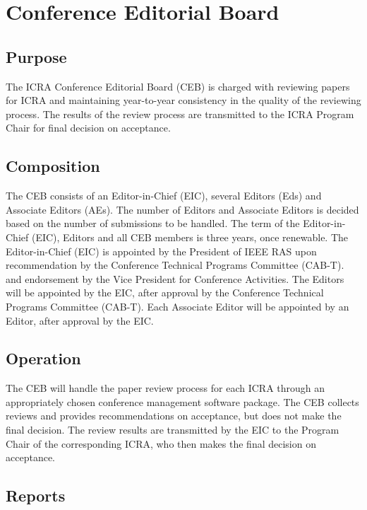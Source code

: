 \documentclass[10pt]{article}
\begin{document}
\section{Conference Editorial Board}
\label{CEB}

\subsection{Purpose}

The ICRA Conference Editorial Board (CEB) is charged with reviewing papers for ICRA and maintaining year-to-year consistency in the quality of the reviewing process. The results of the review process are transmitted to the ICRA Program Chair for final decision on acceptance. 


\subsection{Composition}

The CEB consists of an Editor-in-Chief (EIC), several Editors (Eds) and Associate Editors (AEs). The number of Editors and Associate Editors is decided based on the number of submissions to be handled. The term of the Editor-in-Chief (EIC), Editors and all CEB members is three years, once renewable. The Editor-in-Chief (EIC) is appointed by the President of IEEE RAS upon recommendation by the Conference Technical Programs Committee (CAB-T). and endorsement by the Vice President for Conference Activities. The Editors will be appointed by the EIC, after approval by the Conference Technical Programs Committee (CAB-T). Each Associate Editor will be appointed by an Editor, after approval by the EIC.

\subsection{Operation}

The CEB will handle the paper review process for each ICRA through an appropriately chosen conference management software package. The CEB collects reviews and provides recommendations on acceptance, but does not make the final decision. The review results are transmitted by the EIC to the Program Chair of the corresponding ICRA, who then makes the final decision on acceptance. 

\subsection{Reports}
\end{document}
